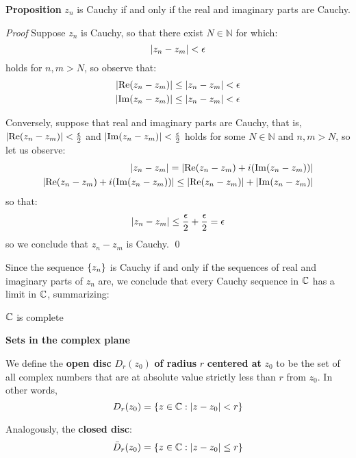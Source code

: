 \textbf{Proposition} $z_n$ is Cauchy if and only if the real and imaginary parts are Cauchy.

\textit{Proof} Suppose $ z_n $ is Cauchy, so that there exist $N \in \mathbb{N} $ for which:
\[ \left| z_n - z_m \right| < \epsilon \]
holds for $ n,m > N $, so observe that:
\begin{align*}
\left| \operatorname{Re}(z_n - z_m) \right| \leq \left| z_n - z_m \right| &< \epsilon \\
\left| \operatorname{Im}(z_n - z_m) \right| \leq \left| z_n - z_m \right| &< \epsilon 
\end{align*}

Conversely, suppose that real and imaginary parts are Cauchy, that is, $ \left| \operatorname{Re}(z_n - z_m) \right| < \frac{\epsilon}{2} $ and $ \left| \operatorname{Im}(z_n - z_m) \right|< \frac{\epsilon}{2} $ holds for some $ N \in \mathbb{N} $ and $ n,m > N  $, so let us observe:
\begin{align*}
\left| z_n - z_m  \right| = \left| \operatorname{Re}(z_n - z_m) + i (\operatorname{Im}(z_n - z_m)) \right| \\
\left| \operatorname{Re}(z_n - z_m) + i (\operatorname{Im}(z_n - z_m)) \right|  \leq \left| \operatorname{Re}(z_n - z_m) \right| + \left| \operatorname{Im}(z_n - z_m) \right|
\end{align*}
so that:
\begin{align*}
\left| z_n - z_m \right| \leq \frac{\epsilon}{2} + \frac{\epsilon}{2} = \epsilon
\end{align*}
so we conclude that $ z_n - z_m $ is Cauchy. \qed

Since the sequence $ \left\lbrace z_n \right\rbrace $ is Cauchy if and only if the sequences of real and imaginary parts of $ z_n $ are, we conclude that every Cauchy sequence in $ \mathbb{C} $ has a limit in $ \mathbb{C} $, summarizing:

\begin{thm}
	$ \mathbb{C} $ is complete
\end{thm}

\textbf{ \LARGE Sets in the complex plane}

\begin{define}
	We define the \textbf{open disc} $ D_r(z_0) $ \textbf{of radius} $r$ \textbf{centered at} $ z_0 $ to be the set of all complex numbers that are at absolute value strictly less than $r$ from $ z_0 $. In other words,
	\[ D_r(z_0) = \left\lbrace z \in \mathbb{C} : \left| z - z_0 \right|< r \right\rbrace \]
\end{define}

Analogously, the \textbf{closed disc}:
\[ \bar{D}_r(z_0) = \left\lbrace z \in \mathbb{C} : \left| z - z_0 \right| \leq r \right\rbrace \]

